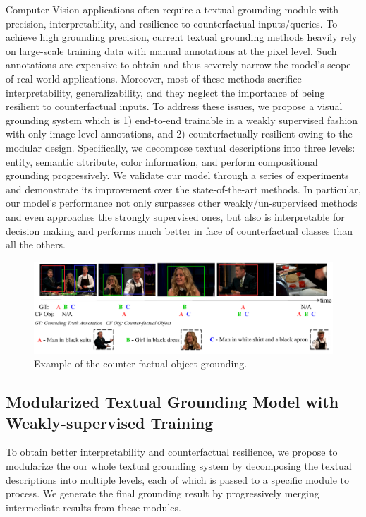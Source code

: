 Computer Vision applications often require a textual grounding module with precision, interpretability, and resilience to counterfactual inputs/queries. To achieve high grounding precision, current textual grounding methods heavily rely on large-scale training data with manual annotations at the pixel level. Such annotations are expensive to obtain and thus severely narrow the model's scope of real-world applications. Moreover, most of these methods sacrifice interpretability, generalizability, and they neglect the importance of being resilient to counterfactual inputs. To address these issues, we propose a visual grounding system which is 1) end-to-end trainable in a weakly supervised fashion with only image-level annotations, and 2) counterfactually resilient owing to the modular design. Specifically, we decompose textual descriptions into three levels: entity, semantic attribute,  color information, and perform compositional grounding progressively. We validate our model through a series of experiments and demonstrate its improvement over the state-of-the-art methods. In particular, our model's performance not only surpasses other weakly/un-supervised methods and even approaches the strongly supervised ones, but also is interpretable for decision making and performs much better in face of counterfactual classes than all the others.


\begin{figure}[t]
\begin{center}
\includegraphics[width=1.0\linewidth]{images/ca_demo.pdf}
\end{center}
\caption{Example of the counter-factual object grounding.}
\label{fig:ca_demo}
\end{figure}


\subsection{Modularized Textual Grounding Model with Weakly-supervised Training}
To obtain better interpretability and counterfactual resilience,
we propose to modularize the our whole textual grounding system
by decomposing the textual descriptions into multiple levels,
each of which is passed to a specific module to process.
We generate the final grounding result by progressively merging intermediate
results from these modules.

